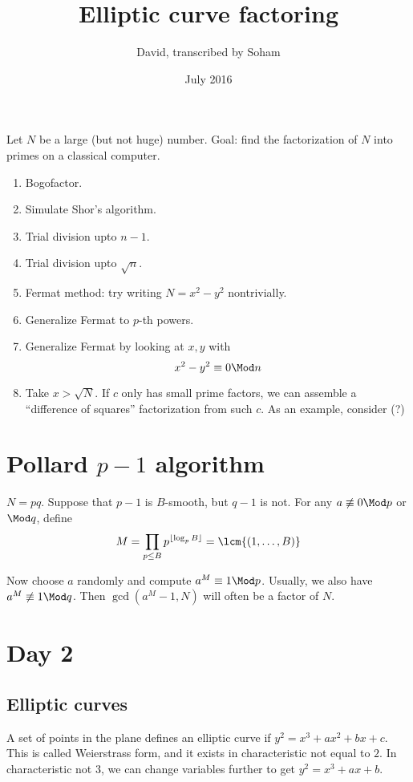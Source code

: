 \documentclass{article}
\title{Elliptic curve factoring}
\author{David, transcribed by Soham}
\date{July 2016}
\begin{document}
\maketitle
 
Let $N$ be a large (but not huge) number. Goal: find the factorization of $N$
into primes on a classical computer.

\begin{enumerate}
\item Bogofactor.
\item Simulate Shor's algorithm.
\item Trial division upto $n-1$.
\item Trial division upto $\sqrt n$.
\item Fermat method: try writing $N=x^2-y^2$ nontrivially.
\item Generalize Fermat to $p$-th powers.
\item Generalize Fermat by looking at $x,y$ with
  $$x^2-y^2 \equiv 0 \Mod n $$

\item Take $x>\sqrt N$. If $c$ only has small prime factors, we can assemble a
  ``difference of squares'' factorization from such $c$. As an example, consider (?) 
\end{enumerate}

\section{Pollard $p-1$ algorithm}
$N = pq$. Suppose that $p-1$ is $B$-smooth, but $q-1$ is not. For any
$a\not\equiv 0\Mod p$ or $\Mod q$, define
$$M=\prod_{p\leq B}p^{\lfloor \log_p B \rfloor} = \lcm{(1,\ldots,B)}$$

Now choose $a$ randomly and compute $a^M\equiv 1\Mod p$. Usually, we also have
$a^M\not\equiv 1\Mod q$. Then $\gcd(a^M-1,N)$ will often be a factor of $N$.

\section{Day 2}
\subsection{Elliptic curves}
A set of points in the plane defines an elliptic curve if $y^2 = x^3+ax^2+bx+c$.
This is called Weierstrass form, and it exists in characteristic not equal to
$2$. In characteristic not $3$, we can change variables further to get $y^2 = x^3+ax+b$.
\end{document}
